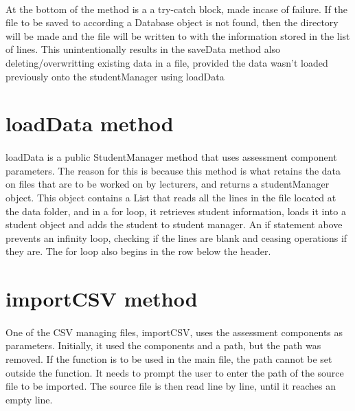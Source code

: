 \paragraph{}
At the bottom of the method is a a try-catch block, made incase of failure. If the file to be saved to according a 
Database object is not found, then the directory will be made and the file will be written to 
with the information stored in the list of lines. This unintentionally results in the saveData method also 
deleting/overwritting existing data in a file, provided the data wasn't loaded previously onto the studentManager using 
loadData

\section{loadData method}
\paragraph{}
loadData is a public StudentManager method that uses assessment component parameters.
The reason for this is because this method is what retains the data on files that are to be worked on 
by lecturers, and returns a studentManager object. This object contains a List that reads all the lines in the file 
located at the data folder, and in a for loop, it retrieves student information, loads it into a student object and 
adds the student to student manager. An if statement above prevents an infinity loop, checking if the lines are blank and 
ceasing operations if they are. The for loop also begins in the row below the header.

\section{importCSV method}
\paragraph{}
One of the CSV managing files, importCSV, uses the assessment components as parameters. 
Initially, it used the components and a path, but the path was removed. If the 
function is to be used in the main file, the path cannot be set outside the function. 
It needs to prompt the user to enter the path of the source file to be imported. 
The source file is then read line by line, until it reaches an empty line.

